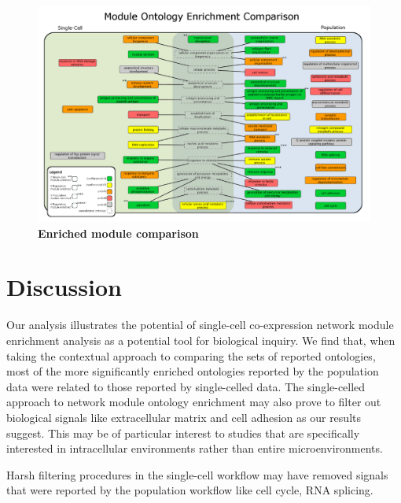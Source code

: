 \documentclass[10pt,letterpaper]{article}
\begin{document}
\begin{figure}
\centering
\includegraphics[width=180mm]{Figures/PopVsSCToCytoscape}
\caption{\textbf{Enriched module comparison}}
\label{fig:venn}
\end{figure}

\section*{Discussion}

Our analysis illustrates the potential of single-cell co-expression network module enrichment analysis as a potential tool for biological inquiry. We find that, when taking the contextual approach to comparing the sets of reported ontologies, most of the more significantly enriched ontologies reported by the population data were related to those reported by single-celled data. The single-celled approach to network module ontology enrichment may also prove to filter out biological signals like extracellular matrix and cell adhesion as our results suggest. This may be of particular interest to studies that are specifically interested in intracellular environments rather than entire microenvironments.

Harsh filtering procedures in the single-cell workflow may have removed signals that were reported by the population workflow like cell cycle, RNA splicing.
\nolinenumbers


%
%
% 





\end{document}
